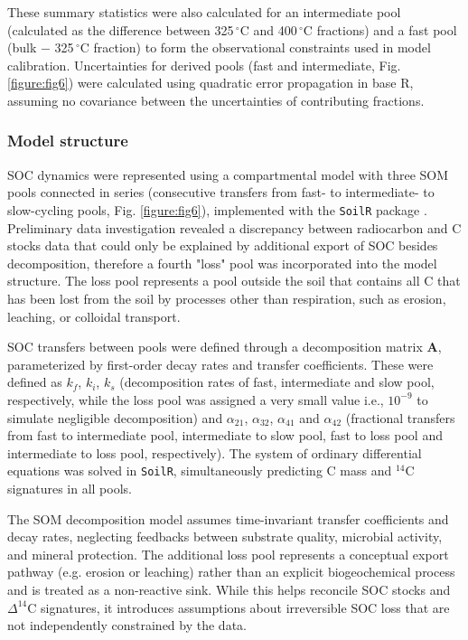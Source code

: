 \documentclass[bg, manuscript]{copernicus}
\begin{document}
These summary statistics were also calculated for an intermediate pool (calculated as the difference between 325\,$^\circ\text{C}$ and 400\,$^\circ\text{C}$ fractions) and a fast pool (bulk $-$ 325\,$^\circ\text{C}$ fraction) to form the observational constraints used in model calibration. Uncertainties for derived pools (fast and intermediate, Fig. \ref{figure:fig6}) were calculated using quadratic error propagation in base R, assuming no covariance between the uncertainties of contributing fractions.

\subsubsection{Model structure}
SOC dynamics were represented using a compartmental model with three SOM pools connected in series (consecutive transfers from fast- to intermediate- to slow-cycling pools, Fig. \ref{figure:fig6}), implemented with the \texttt{SoilR} package \citep{Sierra2012}. Preliminary data investigation revealed a discrepancy between radiocarbon and C stocks data that could only be explained by additional export of SOC besides decomposition, therefore a fourth "loss" pool was incorporated into the model structure. The loss pool represents a pool outside the soil that contains all C that has been lost from the soil by processes other than respiration, such as erosion, leaching, or colloidal transport.

SOC transfers between pools were defined through a decomposition matrix $\mathbf{A}$, parameterized by first-order decay rates and transfer coefficients. These were defined as $k_f$, $k_i$, $k_s$ (decomposition rates of fast, intermediate and slow pool, respectively, while the loss pool was assigned a very small value i.e., $10^{-9}$ to simulate negligible decomposition) and $\alpha_{21}$, $\alpha_{32}$, $\alpha_{41}$ and $\alpha_{42}$ (fractional transfers from fast to intermediate pool, intermediate to slow pool, fast to loss pool and intermediate to loss pool, respectively). The system of ordinary differential equations was solved in \texttt{SoilR}, simultaneously predicting C mass and $^{14}\text{C}$ signatures in all pools.

The SOM decomposition model assumes time-invariant transfer coefficients and decay rates, neglecting feedbacks between substrate quality, microbial activity, and mineral protection. The additional loss pool represents a conceptual export pathway (e.g. erosion or leaching) rather than an explicit biogeochemical process and is treated as a non-reactive sink. While this helps reconcile SOC stocks and $\Delta^{14}\text{C}$ signatures, it introduces assumptions about irreversible SOC loss that are not independently constrained by the data.
\end{document}
